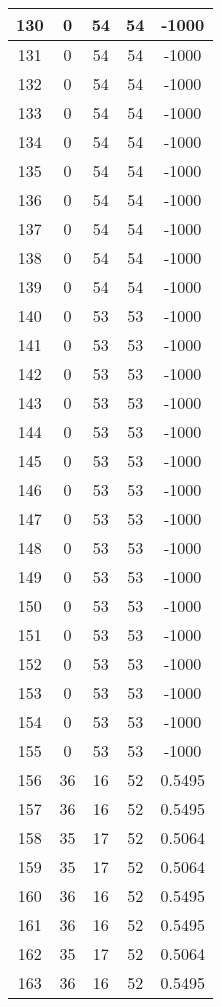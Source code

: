 \documentclass[letterpaper, 12pt]{article}
\begin{document}
\begin{longtable}{|c|c|c|c|c|}
\hline
130 & 0 & 54 & 54 & -1000 \\
\hline
131 & 0 & 54 & 54 & -1000 \\
\hline
132 & 0 & 54 & 54 & -1000 \\
\hline
133 & 0 & 54 & 54 & -1000 \\
\hline
134 & 0 & 54 & 54 & -1000 \\
\hline
135 & 0 & 54 & 54 & -1000 \\
\hline
136 & 0 & 54 & 54 & -1000 \\
\hline
137 & 0 & 54 & 54 & -1000 \\
\hline
138 & 0 & 54 & 54 & -1000 \\
\hline
139 & 0 & 54 & 54 & -1000 \\
\hline
140 & 0 & 53 & 53 & -1000 \\
\hline
141 & 0 & 53 & 53 & -1000 \\
\hline
142 & 0 & 53 & 53 & -1000 \\
\hline
143 & 0 & 53 & 53 & -1000 \\
\hline
144 & 0 & 53 & 53 & -1000 \\
\hline
145 & 0 & 53 & 53 & -1000 \\
\hline
146 & 0 & 53 & 53 & -1000 \\
\hline
147 & 0 & 53 & 53 & -1000 \\
\hline
148 & 0 & 53 & 53 & -1000 \\
\hline
149 & 0 & 53 & 53 & -1000 \\
\hline
150 & 0 & 53 & 53 & -1000 \\
\hline
151 & 0 & 53 & 53 & -1000 \\
\hline
152 & 0 & 53 & 53 & -1000 \\
\hline
153 & 0 & 53 & 53 & -1000 \\
\hline
154 & 0 & 53 & 53 & -1000 \\
\hline
155 & 0 & 53 & 53 & -1000 \\
\hline
156 & 36 & 16 & 52 & 0.5495 \\
\hline
157 & 36 & 16 & 52 & 0.5495 \\
\hline
158 & 35 & 17 & 52 & 0.5064 \\
\hline
159 & 35 & 17 & 52 & 0.5064 \\
\hline
160 & 36 & 16 & 52 & 0.5495 \\
\hline
161 & 36 & 16 & 52 & 0.5495 \\
\hline
162 & 35 & 17 & 52 & 0.5064 \\
\hline
163 & 36 & 16 & 52 & 0.5495 \\

\end{longtable}
\end{document}
